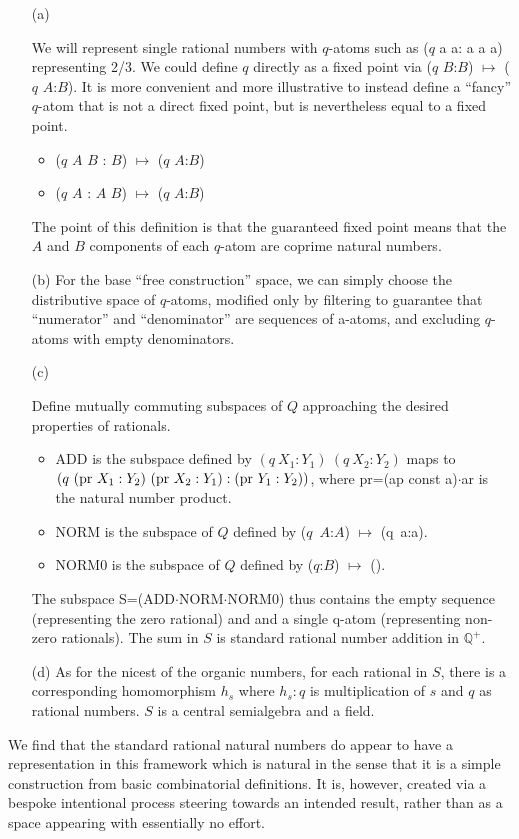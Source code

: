 \documentclass[11pt]{article}
\begin{document}
\begin{itemize} 
\item[(a)] { 
We will represent single rational numbers with $q$-atoms such as ($q$ a a: a a a) representing 2/3.  
We could define $q$ directly as a fixed point via ($q$ $B$:$B$) $\mapsto$ ($q$ $A$:$B$).  
It is more convenient and more illustrative to instead define a ``fancy'' $q$-atom that is not a direct fixed point, but is nevertheless equal to a fixed point. 
\begin{itemize}
\item{($q$ $A$ $B$ : $B$) $\mapsto$ ($q$ $A$:$B$)}
\item{($q$ $A$ : $A$ $B$) $\mapsto$ ($q$ $A$:$B$)} 
\end{itemize}
The point of this definition is that the guaranteed fixed point means that the $A$ and $B$ components of each $q$-atom 
are coprime natural numbers.
 }
 \item[(b)] {For the base ``free construction'' space, we can simply choose the distributive space of $q$-atoms, modified only by 
 filtering to guarantee that ``numerator'' and ``denominator'' are sequences of a-atoms, and excluding $q$-atoms with empty denominators. 
}
 \item[(c)] {Define mutually commuting subspaces of $Q$ approaching the desired properties of rationals. 
\begin{itemize}
\item{ADD is the subspace defined by $(q\ X_1:Y_1)\ (q\ X_2:Y_2)$ maps to 
$(q\ ({\rm pr}\ X_1:Y_2)\ ({\rm pr}\ X_2:Y_1) : ({\rm pr}\ Y_1:Y_2))$, where 
pr=(ap const a)$\cdot$ar is the natural number product.}
\item{NORM is the subspace of $Q$ defined by ($q$\ $A$:$A$) $\mapsto$ (q\ a:a).}
\item{NORM0 is the subspace of $Q$ defined by ($q$:$B$) $\mapsto$ ().}  
\end{itemize}
The subspace S=(ADD$\cdot$NORM$\cdot$NORM0) thus contains the empty sequence (representing the zero rational) and 
and a single q-atom (representing non-zero rationals).  The sum in $S$ is standard rational number addition in $\mathbb Q^+$.

 }
 \item[(d)] { 
 As for the nicest of the organic numbers, for each rational in $S$, there is a corresponding homomorphism $h_s$ where $h_s:q$ is multiplication 
of $s$ and $q$ as rational numbers.  $S$ is a central semialgebra and a field.  
 }
 \end{itemize} 
 We find that the standard rational natural numbers do appear to have a representation in this framework which is natural in the sense that 
 it is a simple construction from basic combinatorial definitions.  It is, however, created via a bespoke intentional process steering towards 
 an intended result, rather than as a space appearing with essentially no effort. 
 
\end{document}
